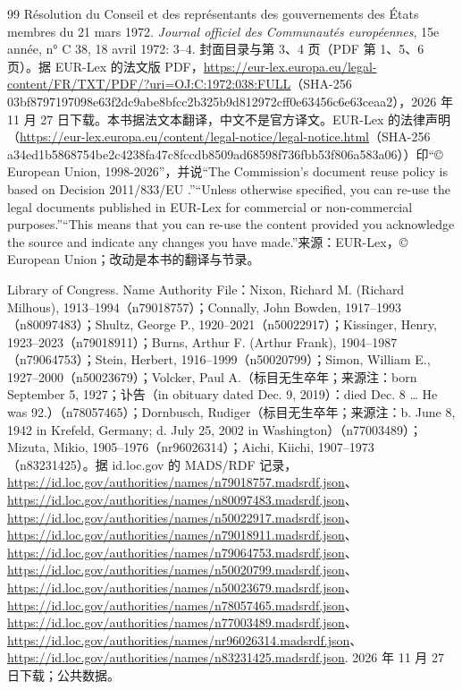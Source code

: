 \begin{thebibliography}{99}
 Résolution du Conseil et des représentants des gouvernements des États membres du 21 mars 1972. \emph{Journal officiel des Communautés européennes}, 15e année, n° C 38, 18 avril 1972: 3--4. 封面目录与第 3、4 页（PDF 第 1、5、6 页）。据 EUR-Lex 的法文版 PDF，\url{https://eur-lex.europa.eu/legal-content/FR/TXT/PDF/?uri=OJ:C:1972:038:FULL}（SHA-256 03bf8797197098e63f2dc9abe8bfcc2b325b9d812972cff0e63456c6e63ceaa2），2026 年 11 月 27 日下载。本书据法文本翻译，中文不是官方译文。EUR-Lex 的法律声明（\url{https://eur-lex.europa.eu/content/legal-notice/legal-notice.html}（SHA-256 a34ed1b5868754be2c4238fa47c8fccdb8509ad68598f736fbb53f806a583a06））印“© European Union, 1998-2026”，并说“The Commission's document reuse policy is based on Decision 2011/833/EU .”“Unless otherwise specified, you can re-use the legal documents published in EUR-Lex for commercial or non-commercial purposes.”“This means that you can re-use the content provided you acknowledge the source and indicate any changes you have made.”来源：EUR-Lex，© European Union；改动是本书的翻译与节录。

 Library of Congress. Name Authority File：Nixon, Richard M. (Richard Milhous), 1913--1994（n79018757）；Connally, John Bowden, 1917--1993（n80097483）；Shultz, George P., 1920--2021（n50022917）；Kissinger, Henry, 1923--2023（n79018911）；Burns, Arthur F. (Arthur Frank), 1904--1987（n79064753）；Stein, Herbert, 1916--1999（n50020799）；Simon, William E., 1927--2000（n50023679）；Volcker, Paul A.（标目无生卒年；来源注：born September 5, 1927；讣告（in obituary dated Dec. 9, 2019）：died Dec. 8 … He was 92.）（n78057465）；Dornbusch, Rudiger（标目无生卒年；来源注：b. June 8, 1942 in Krefeld, Germany; d. July 25, 2002 in Washington）（n77003489）；Mizuta, Mikio, 1905--1976（nr96026314）；Aichi, Kiichi, 1907--1973（n83231425）。据 id.loc.gov 的 MADS/RDF 记录，\url{https://id.loc.gov/authorities/names/n79018757.madsrdf.json}、\url{https://id.loc.gov/authorities/names/n80097483.madsrdf.json}、\url{https://id.loc.gov/authorities/names/n50022917.madsrdf.json}、\url{https://id.loc.gov/authorities/names/n79018911.madsrdf.json}、\url{https://id.loc.gov/authorities/names/n79064753.madsrdf.json}、\url{https://id.loc.gov/authorities/names/n50020799.madsrdf.json}、\url{https://id.loc.gov/authorities/names/n50023679.madsrdf.json}、\url{https://id.loc.gov/authorities/names/n78057465.madsrdf.json}、\url{https://id.loc.gov/authorities/names/n77003489.madsrdf.json}、\url{https://id.loc.gov/authorities/names/nr96026314.madsrdf.json}、\url{https://id.loc.gov/authorities/names/n83231425.madsrdf.json}. 2026 年 11 月 27 日下载；公共数据。


\end{thebibliography}
